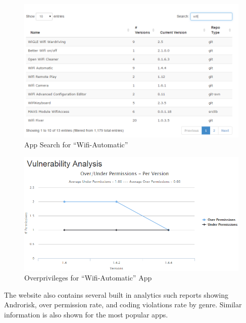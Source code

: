 \begin{figure}[ht!]
\centering
\includegraphics[width=\columnwidth, angle = 0]{images/wifi-automatic_app_search.png}
\caption{App Search for ``Wifi-Automatic'' }
\label{fig:appsearch}
\end{figure}

\begin{figure}[ht!]
\centering
\includegraphics[width=\columnwidth, angle = 0]{images/wifi-automatic-oprivs.png}
\caption{Overprivileges for ``Wifi-Automatic'' App}
\label{fig:specificAppInfo}
\end{figure}


The website also contains several built in analytics such reports showing Androrisk, over permission rate, and coding violations rate by genre. Similar information is also shown for the most popular apps.







